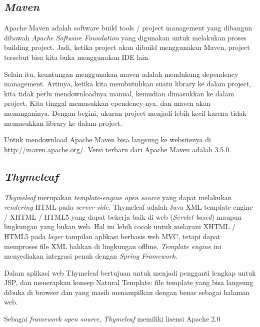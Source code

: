 
\subsection{\textit{Maven} \cite{MengenalMaven2015EGunawan}}
Apache Maven adalah software build tools / project management yang dibangun dibawah \textit{Apache Software Foundation} yang digunakan untuk melakukan proses building project. Jadi, ketika project akan dibuild menggunakan Maven, project tersebut bisa kita buka menggunakan IDE lain.

Selain itu, keuntungan menggunakan maven adalah mendukung dependency management. Artinya, ketika kita membutuhkan suatu library ke dalam project, kita tidak perlu mendownloadnya manual, kemudian dimasukkan ke dalam project. Kita tinggal memasukkan  ependency-nya, dan maven akan menanganinya.  Dengan begini, ukuran project menjadi lebih kecil karena tidak memasukkan library ke dalam project.

Untuk mendownload Apache Maven bisa langsung ke websitenya di \url{http://maven.apache.org/}. Versi terbaru dari Apache Maven adalah 3.5.0.

\subsection{\textit{Thymeleaf} \cite{CogoluegnesIntroducing:2013}}
\textit{Thymeleaf} merupakan \textit{template-engine open source} yang dapat melakukan \textit{rendering} HTML pada \textit{server-side}. Thymeleaf adalah Java XML template engine / XHTML / HTML5 yang dapat bekerja baik di web (\textit{Servlet-based}) maupun lingkungan yang bukan web. Hal ini lebih cocok untuk melayani XHTML / HTML5 pada \textit{layer} tampilan aplikasi berbasis web MVC, tetapi dapat memproses file XML bahkan di lingkungan offline. \textit{Template engine} ini menyediakan integrasi penuh dengan \textit{Spring Framework}. 

Dalam aplikasi web Thymeleaf bertujuan untuk menjadi pengganti lengkap untuk JSP, dan menerapkan konsep Natural Template: file template yang bisa langsung dibuka di browser dan yang masih menampilkan dengan benar sebagai halaman web.

Sebagai \textit{framework open source}, \textit{Thymeleaf} memiliki lisensi Apache 2.0 



